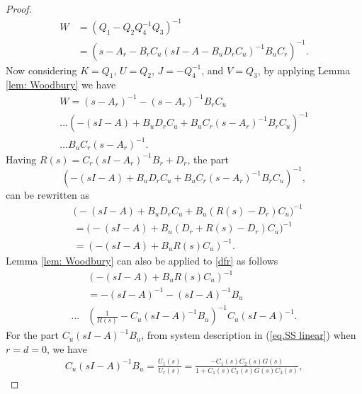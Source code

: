 \begin{proof}
\begin{equation}
\begin{split}
W &= \left(Q_1 - Q_2 Q_4^{-1} Q_3\right)^{-1} \\ &= \left(s - A_r - B_r C_u (sI - A - B_u D_r C_u)^{-1} B_u C_r\right)^{-1}.
\end{split}
\label{eq: W expand}
\end{equation}
Now considering $K=Q_1$, $U=Q_2$, $J=-Q_4^{-1}$, and $V=Q_3$, by applying Lemma \ref{lem: Woodbury} we have
 \begin{multline}
W = \left(s - A_r\right)^{-1} - \left(s - A_r\right)^{-1} B_r C_u \\ ...\left(-(sI - A) + B_u D_r C_u + B_u C_r \left(s - A_r\right)^{-1}B_r C_u\right)^{-1}\\...B_u C_r \left(s - A_r\right)^{-1}.
\label{eq: W expand 2}
 \end{multline}
Having $R(s)=C_r(sI-A_r)^{-1}B_r+D_r$, the part
\begin{equation}
\left(-(sI - A) + B_u D_r C_u + B_u C_r \left(s - A_r\right)^{-1}B_r C_u\right)^{-1},
\end{equation}
can be rewritten as
\begin{equation}
\label{dfr}
\begin{split}
&\Big(-(sI - A) + B_u D_r C_u + B_u (R(s)-D_r) C_u\Big)^{-1} \\ &= \Big(-(sI - A) + B_u \left(D_r + R(s) - D_r\right) C_u\Big)^{-1}  \\
&= \left(-(sI - A) + B_u R(s) C_u\right)^{-1}.
\end{split}
\end{equation}
Lemma \ref{lem: Woodbury} can also be applied to \eqref{dfr} as follows
\begin{equation}
\begin{split}
&\left(-(sI - A) + B_u R(s) C_u\right)^{-1} \\
&=-\left(sI - A\right)^{-1} - \left(sI - A\right)^{-1} B_u\\... &\left(\frac{1}{{R(s)}} - C_u \left(sI - A\right)^{-1} B_u\right)^{-1} C_u \left(sI - A\right)^{-1}.
\end{split}
\label{eq: w expand}
\end{equation}
For the part $C_u (sI - A)^{-1} B_u$, from system description in (\ref{eq.SS linear}) when $r=d=0$, we have
\begin{equation}
\begin{split}
C_u (sI - A)^{-1} B_u = \frac{U_1(s)}{U_r(s)} = \frac{-C_1(s) C_2(s) G(s)}{1 + C_1(s) C_2(s) G(s) C_3(s)},
\label{eq: P}
\end{split}

\end{equation}
\end{proof}
